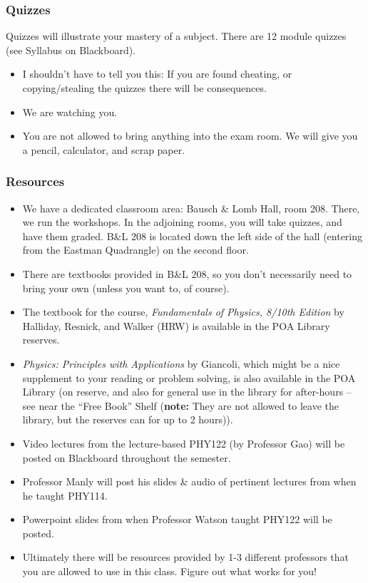 \documentclass[12pt]{article}
\begin{document}
\subsubsection{Quizzes} \label{sec:q}

Quizzes will illustrate your mastery of a subject. There are 12 module quizzes (see Syllabus on Blackboard).

\begin{itemize}
	\item I shouldn't have to tell you this: If you are found cheating, or copying/stealing the quizzes there will be consequences.
	\item We are watching you.
	\item You are not allowed to bring anything into the exam room. We will give you a pencil, calculator, and scrap paper.
\end{itemize}

\subsubsection{Resources} \label{sec:r}

\begin{itemize}
	\item We have a dedicated classroom area: Bausch \& Lomb Hall, room 208. There, we run the workshops. In the adjoining rooms, you will take quizzes, and have them graded. B\&L 208 is located down the left side of the hall (entering from the Eastman Quadrangle) on the second floor.
	\item There are textbooks provided in B\&L 208, so you don't necessarily need to bring your own (unless you want to, of course).
	\item The textbook for the course, \emph{Fundamentals of Physics, 8/10th Edition} by Halliday, Resnick, and Walker (HRW) is available in the POA Library reserves.
	\item \emph{Physics: Principles with Applications} by Giancoli, which might be a nice supplement to your reading or problem solving, is also available in the POA Library (on reserve, and also for general use in the library for after-hours -- see near the ``Free Book'' Shelf (\textbf{note:} They are not allowed to leave the library, but the reserves can for up to 2 hours)).
	\item Video lectures from the lecture-based PHY122 (by Professor Gao) will be posted on Blackboard throughout the semester.
	\item Professor Manly will post his slides \& audio of pertinent lectures from when he taught PHY114.
	\item Powerpoint slides from when Professor Watson taught PHY122 will be posted.
	\item Ultimately there will be resources provided by 1-3 different professors that you are allowed to use in this class. Figure out what works for you!
\end{itemize}
\end{document}

